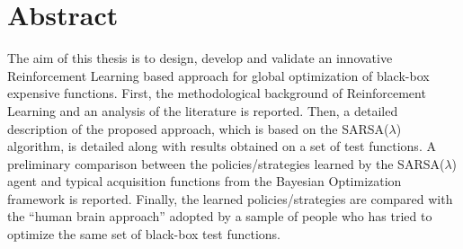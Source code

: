 \chapter*{Abstract}
\pagestyle{plain}

The aim of this thesis is to design, develop and validate an innovative Reinforcement Learning based approach for global optimization of black-box expensive functions.
First, the methodological background of Reinforcement Learning and an analysis of the literature is reported. Then, a detailed description of the proposed approach, which is based on the SARSA($\lambda$) algorithm, is detailed along with results obtained on a set of test functions. A preliminary comparison between the policies/strategies learned by the SARSA($\lambda$) agent and typical acquisition functions from the Bayesian Optimization framework is reported. Finally, the learned policies/strategies are compared with the \enquote{human brain approach} adopted by a sample of people who has tried to optimize the same set of black-box test functions.